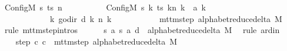 \begin{isabellebody}
\ {\isachardoublequoteopen}{\isacharparenleft}{\kern0pt}Config\isactrlsub M\ {\isacharquery}{\kern0pt}s\ ts\ n{\isacharcomma}{\kern0pt}\isanewline
\ \ \ \ \ \ \ \ \ \ Config\isactrlsub M\ {\isacharquery}{\kern0pt}s{\isacharprime}{\kern0pt}\ {\isacharparenleft}{\kern0pt}{\isasymlambda}k{\isachardot}{\kern0pt}\ {\isacharparenleft}{\kern0pt}ts\ k{\isacharparenright}{\kern0pt}{\isacharparenleft}{\kern0pt}n\ k\ {\isacharcolon}{\kern0pt}{\isacharequal}{\kern0pt}\ {\isacharquery}{\kern0pt}a\ k{\isacharparenright}{\kern0pt}{\isacharparenright}{\kern0pt}\isanewline
\ \ \ \ \ \ \ \ \ \ \ \ {\isacharparenleft}{\kern0pt}{\isasymlambda}k{\isachardot}{\kern0pt}\ go{\isacharunderscore}{\kern0pt}dir\ {\isacharparenleft}{\kern0pt}{\isacharquery}{\kern0pt}d\ k{\isacharparenright}{\kern0pt}\ {\isacharparenleft}{\kern0pt}n\ k{\isacharparenright}{\kern0pt}{\isacharparenright}{\kern0pt}{\isacharparenright}{\kern0pt}\isanewline
\ \ \ \ \ \ \ \ \ \ {\isasymin}\ mttm{\isacharunderscore}{\kern0pt}step\ {\isacharparenleft}{\kern0pt}alphabet{\isacharunderscore}{\kern0pt}reduce{\isacharunderscore}{\kern0pt}delta\ M{\isacharparenright}{\kern0pt}{\isachardoublequoteclose}\isanewline
\ \ \isamarkupfalse%
\ {\isacharparenleft}{\kern0pt}rule\ mttm{\isacharunderscore}{\kern0pt}step{\isachardot}{\kern0pt}intros{\isacharparenright}{\kern0pt}\isanewline
\ \ \ \ \isamarkupfalse%
\ {\isachardoublequoteopen}{\isacharparenleft}{\kern0pt}{\isacharquery}{\kern0pt}s{\isacharcomma}{\kern0pt}\ {\isacharquery}{\kern0pt}a{\isacharcomma}{\kern0pt}\ {\isacharquery}{\kern0pt}s{\isacharprime}{\kern0pt}{\isacharcomma}{\kern0pt}\ {\isacharquery}{\kern0pt}a{\isacharcomma}{\kern0pt}\ {\isacharquery}{\kern0pt}d{\isacharparenright}{\kern0pt}\ {\isasymin}\ alphabet{\isacharunderscore}{\kern0pt}reduce{\isacharunderscore}{\kern0pt}delta\ M{\isachardoublequoteclose}\ \isamarkupfalse%
\ {\isacharparenleft}{\kern0pt}rule\ ard{\isacharunderscore}{\kern0pt}in{\isacharparenright}{\kern0pt}\isanewline
\ \ \isamarkupfalse%
\isanewline
\ \ \isamarkupfalse%
\ step{\isacharcolon}{\kern0pt}\ {\isachardoublequoteopen}{\isacharparenleft}{\kern0pt}c{\isacharprime}{\kern0pt}{\isacharcomma}{\kern0pt}\ {\isacharquery}{\kern0pt}c{\isacharprime}{\kern0pt}{\isacharprime}{\kern0pt}{\isacharparenright}{\kern0pt}\ {\isasymin}\ mttm{\isacharunderscore}{\kern0pt}step\ {\isacharparenleft}{\kern0pt}alphabet{\isacharunderscore}{\kern0pt}reduce{\isacharunderscore}{\kern0pt}delta\ M{\isacharparenright}{\kern0pt}{\isachardoublequoteclose}\isanewline

\end{isabellebody}
